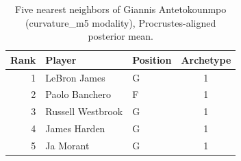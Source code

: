 \begin{table}[htbp]
  \centering\small
  \begin{tabular}{rllc}
    \toprule
    Rank & Player & Position & Archetype \\
    \midrule
    1 & LeBron James & G & 1 \\
    2 & Paolo Banchero & F & 1 \\
    3 & Russell Westbrook & G & 1 \\
    4 & James Harden & G & 1 \\
    5 & Ja Morant & G & 1 \\
    \bottomrule
  \end{tabular}
  \caption{Five nearest neighbors of Giannis Antetokounmpo (curvature_m5 modality), Procrustes-aligned posterior mean.}
  \label{tab:Giannis_Antetokounmpo_neighbors_curvature_m5}
\end{table}

